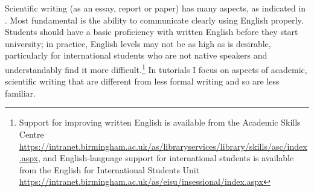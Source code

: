 Scientific writing (as an essay, report or paper) has many aspects, as indicated in . Most fundamental is the ability to communicate clearly using English properly. Students should have a basic proficiency with written English before they start university; in practice, English levels may not be as high as is desirable, particularly for international students who are not native speakers and understandably find it more difficult.\footnote{Support for improving written English is available from the Academic Skills Centre \url{https://intranet.birmingham.ac.uk/as/libraryservices/library/skills/asc/index.aspx}, and English-language support for international students is available from the English for International Students Unit \url{https://intranet.birmingham.ac.uk/as/eisu/insessional/index.aspx}} In tutorials I focus on aspects of academic, scientific writing that are different from less formal writing and so are less familiar.


